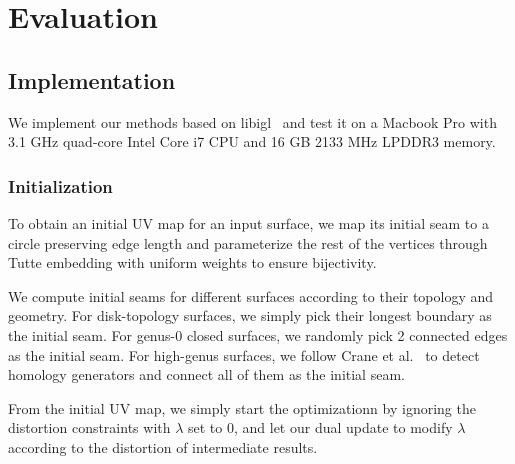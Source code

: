 
\section{Evaluation}
\label{sec:results}

\subsection{Implementation}
\label{sec:imp}

We implement our methods based on libigl\ \cite{libigl} and test it on a Macbook Pro with 3.1 GHz quad-core Intel Core i7 CPU and 16 GB 2133 MHz LPDDR3 memory.

\subsubsection{Initialization}
To obtain an initial UV map for an input surface, we map its initial seam to a circle preserving edge length and parameterize the rest of the vertices through Tutte embedding with uniform weights to ensure bijectivity.

We compute initial seams for different surfaces according to their topology and geometry. For disk-topology surfaces, we simply pick their longest boundary as the initial seam. For genus-0 closed surfaces, we randomly pick 2 connected edges as the initial seam. For high-genus surfaces, we follow Crane et al.~ to detect homology generators and connect all of them as the initial seam.

From the initial UV map, we simply start the optimizationn by ignoring the distortion constraints with $\lambda$ set to $0$, and let our dual update to modify $\lambda$ according to the distortion of intermediate results.


